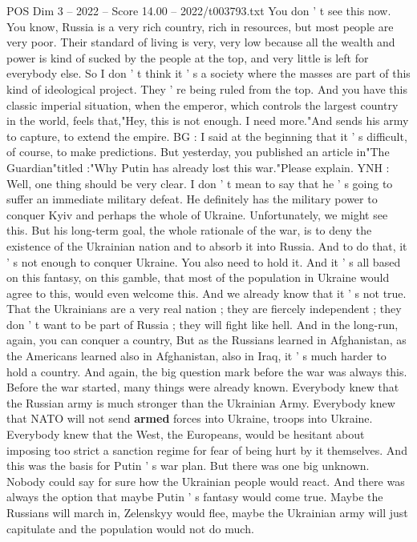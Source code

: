 \begin{textsample}{POS Dim 3 – 2022 – Score 14.00 – 2022/t003793.txt}
You don ' t see this now.
You know, Russia is a very rich country, rich in resources, but most people are very poor.
Their standard of living is very, very low because all the wealth and power is kind of sucked by the people at the top, and very little is left for everybody else.
So I don ' t think it ' s a society where the masses are part of this kind of ideological project.
They ' re being ruled from the top.
And you have this classic imperial situation, when the emperor, which controls the largest country in the world, feels that,"Hey, this is not enough.
I need more."And sends his army to capture, to extend the empire.
BG : I said at the beginning that it ' s difficult, of course, to make predictions.
But yesterday, you published an article in"The Guardian"titled :"Why Putin has already lost this war."Please explain.
YNH : Well, one thing should be very clear.
I don ' t mean to say that he ' s going to suffer an immediate military defeat.
He definitely has the military power to conquer Kyiv and perhaps the whole of Ukraine.
Unfortunately, we might see this.
But his long-term goal, the whole rationale of the war, is to deny the existence of the Ukrainian nation and to absorb it into Russia.
And to do that, it ' s not enough to conquer Ukraine.
You also need to hold it.
And it ' s all based on this fantasy, on this gamble, that most of the population in Ukraine would agree to this, would even welcome this.
And we already know that it ' s not true.
That the Ukrainians are a very real nation ; they are fiercely independent ; they don ' t want to be part of Russia ; they will fight like hell.
And in the long-run, again, you can conquer a country, But as the Russians learned in Afghanistan, as the Americans learned also in Afghanistan, also in Iraq, it ' s much harder to hold a country.
And again, the big question mark before the war was always this.
Before the war started, many things were already known.
Everybody knew that the Russian army is much stronger than the Ukrainian Army.
Everybody knew that NATO will not send \textbf{armed} forces into Ukraine, troops into Ukraine.
Everybody knew that the West, the Europeans, would be hesitant about imposing too strict a sanction regime for fear of being hurt by it themselves.
And this was the basis for Putin ' s war plan.
But there was one big unknown.
Nobody could say for sure how the Ukrainian people would react.
And there was always the option that maybe Putin ' s fantasy would come true.
Maybe the Russians will march in, Zelenskyy would flee, maybe the Ukrainian army will just capitulate and the population would not do much.

\end{textsample}
